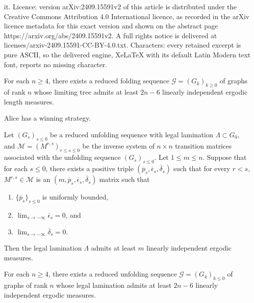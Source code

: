 \documentclass[10pt,a4paper]{amsart}
\newcommand{\calG}{\mathcal{G}}
\newcommand{\calM}{\mathcal{M}}
\newcommand{\eps}{\epsilon}
\newcommand{\ov}[1]{\overline{#1}}
\begin{document}
it. Licence: version arXiv:2409.15591v2 of this article is distributed under the Creative Commons Attribution 4.0 International licence, as recorded in the arXiv licence metadata for this exact version and shown on the abstract page https://arxiv.org/abs/2409.15591v2. A full rights notice is delivered at licenses/arxiv-2409.15591-CC-BY-4.0.txt. Characters: every retained excerpt is pure ASCII, so the delivered engine, XeLaTeX with its default Latin Modern text font, reports no missing character.
\begin{theorem} \label{thm:lowerboundFinale_folding}
For each $n \ge 4$, there exists a reduced folding sequence $\calG=(G_k)_{k \ge 0}$ of
graphs of rank $n$ whose limiting tree admits at least $2n-6$ linearly independent ergodic length measures.
\end{theorem}

\begin{theorem}\label{thm:TheGame}
  Alice has a winning strategy. 
\end{theorem}

\begin{theorem} \label{thm:klp_then_ergodic}
Let $(G_s)_{s \le 0}$ be a reduced unfolding sequence with legal lamination $\Lambda \subset G_0$, and $\calM = (M^{r,s})_{r \le s \le 0}$ be the inverse system of $n \times n$ transition matrices associated with the unfolding sequence $(G_s)_{s \le 0}$. Let $1
\le m \le n$. Suppose that for each $s \le 0$, there exists a positive triple $(\ov{p}_s, \ov{\eps}_s,
\ov{\delta}_s)$ such that for every $r < s$, $M^{r,s} \in \calM$ is an $(m, \ov{p}_s,
\ov{\eps}_s,\ov{\delta}_s)$ matrix such that 
\begin{enumerate}[label=(\roman*)]
\item $\{\ov{p}_s\}_{s \le 0}$ is uniformly bounded,
\item $\lim_{s \to -\infty} \ov{\eps}_s =0$, and
\item $\lim_{s \to -\infty} \ov{\delta}_s =0$.
\end{enumerate}
Then the legal
lamination $\Lambda$ admits at least $m$ linearly independent ergodic measures.
\end{theorem}

\begin{theorem} \label{thm:lowerboundFinale_unfolding} 
For each $n \ge 4$, there exists a reduced unfolding sequence
$\calG=(G_k)_{k \le 0}$ of graphs
of rank $n$ whose legal lamination admits at least $2n-6$ linearly independent ergodic measures.
\end{theorem}
\end{document}
